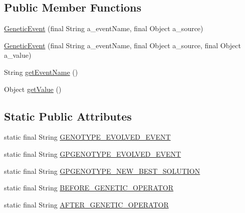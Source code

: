 \subsection*{Public Member Functions}
\begin{DoxyCompactItemize}
\item 
\hyperlink{classorg_1_1jgap_1_1event_1_1_genetic_event_a2a92351586e78c45fc35ce47a28e2256}{Genetic\-Event} (final String a\-\_\-event\-Name, final Object a\-\_\-source)
\item 
\hyperlink{classorg_1_1jgap_1_1event_1_1_genetic_event_ac75efa01504b38180a7ea717a54f6944}{Genetic\-Event} (final String a\-\_\-event\-Name, final Object a\-\_\-source, final Object a\-\_\-value)
\item 
String \hyperlink{classorg_1_1jgap_1_1event_1_1_genetic_event_ae227d1170aa60f5fd11e40f96e178c57}{get\-Event\-Name} ()
\item 
Object \hyperlink{classorg_1_1jgap_1_1event_1_1_genetic_event_af6fed6bad412cb0d3d85b9721c764791}{get\-Value} ()
\end{DoxyCompactItemize}
\subsection*{Static Public Attributes}
\begin{DoxyCompactItemize}
\item 
static final String \hyperlink{classorg_1_1jgap_1_1event_1_1_genetic_event_aeb761be1841e7284cd6502242f6f7110}{G\-E\-N\-O\-T\-Y\-P\-E\-\_\-\-E\-V\-O\-L\-V\-E\-D\-\_\-\-E\-V\-E\-N\-T}
\item 
static final String \hyperlink{classorg_1_1jgap_1_1event_1_1_genetic_event_a6fbe66a6b68922a67456d407784c5cdf}{G\-P\-G\-E\-N\-O\-T\-Y\-P\-E\-\_\-\-E\-V\-O\-L\-V\-E\-D\-\_\-\-E\-V\-E\-N\-T}
\item 
static final String \hyperlink{classorg_1_1jgap_1_1event_1_1_genetic_event_a9fef77e1b6f180761ff13984f153b6d5}{G\-P\-G\-E\-N\-O\-T\-Y\-P\-E\-\_\-\-N\-E\-W\-\_\-\-B\-E\-S\-T\-\_\-\-S\-O\-L\-U\-T\-I\-O\-N}
\item 
static final String \hyperlink{classorg_1_1jgap_1_1event_1_1_genetic_event_ac2f5a109639d6ce47610900289af86dd}{B\-E\-F\-O\-R\-E\-\_\-\-G\-E\-N\-E\-T\-I\-C\-\_\-\-O\-P\-E\-R\-A\-T\-O\-R}
\item 
static final String \hyperlink{classorg_1_1jgap_1_1event_1_1_genetic_event_a5ee6c5ee59ba2cbea5dea8bfe5e721b7}{A\-F\-T\-E\-R\-\_\-\-G\-E\-N\-E\-T\-I\-C\-\_\-\-O\-P\-E\-R\-A\-T\-O\-R}
\end{DoxyCompactItemize}
